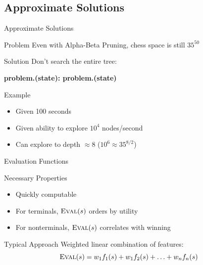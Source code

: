 \documentclass[14pt]{beamer}
\begin{document}
\subsection{Approximate Solutions}
\begin{frame}[fragile]{Approximate Solutions}
	\begin{block}{Problem}
		Even with Alpha-Beta Pruning, chess space is still $35^{50}$
	\end{block}
	\pause
	\begin{block}{Solution}
		Don't search the entire tree:
		\begin{semiverbatim}\scriptsize\bfseries
		     problem.(state):
		         problem.(state)
		
		\end{semiverbatim}
	\end{block}
	\pause\pause
	\begin{block}{Example}
		\begin{itemize}
			\item Given 100 seconds
			\item Given ability to explore $10^4$ nodes/second
			\item Can explore to depth $\approx 8$ ($10^6 \approx 35^{8/2}$)
		\end{itemize}
	\end{block}
\end{frame}
\begin{frame}{Evaluation Functions}
	\begin{block}{Necessary Properties}
		\begin{itemize}
			\item Quickly computable
			\item For terminals, $\textsc{Eval}(s)$ orders by utility
			\item For nonterminals, $\textsc{Eval}(s)$ correlates with winning
		\end{itemize}
	\end{block}
	\pause
	\begin{block}{Typical Approach}
		Weighted linear combination of features:
		\[\mbox{\sc Eval}(s) = w_1 f_1(s) + w_1 f_2(s) + \ldots + w_n f_n(s)\]
	\end{block}
\end{frame}
\end{document}
